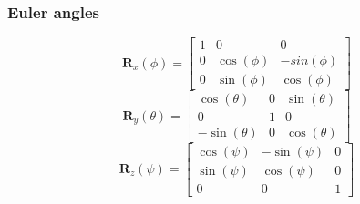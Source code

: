 \documentclass[12pt,a4paper,oneside]{article}
\begin{document}
\subsubsection{Euler angles}
\cite{euler1775formulae}
\begin{equation}
\bm{R}_x(\phi) = \begin{bmatrix}
1 & 0 & 0 \\
0 & \cos(\phi) & -sin(\phi) \\
0 & \sin(\phi) & \cos(\phi)
\end{bmatrix}
\end{equation}
\begin{equation}
\bm{R}_y(\theta) = \begin{bmatrix}
\cos(\theta) & 0 & \sin(\theta) \\
0 & 1 & 0 \\
-\sin(\theta) & 0 & \cos(\theta)
\end{bmatrix}
\end{equation}
\begin{equation}
\bm{R}_z(\psi) = \begin{bmatrix}
\cos(\psi) & -\sin(\psi) & 0 \\
\sin(\psi) & \cos(\psi) & 0 \\
0 & 0 & 1
\end{bmatrix}
\end{equation}
\end{document}
